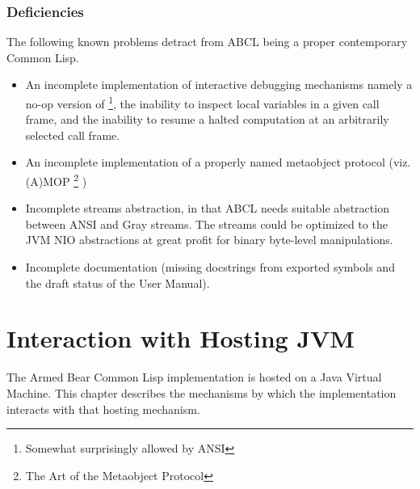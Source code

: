 \documentclass[10pt]{book}
\begin{document}
\subsection{Deficiencies}
The following known problems detract from \textsc{ABCL} being a proper
contemporary Common Lisp.
\begin{itemize}

  \item An incomplete implementation of interactive debugging
    mechanisms namely a no-op version of
     \footnote{Somewhat surprisingly allowed by
      \textsc{ANSI}}, the inability to inspect local variables in a
    given call frame, and the inability to resume a halted computation
    at an arbitrarily selected call frame.

  \item An incomplete implementation of a properly named metaobject
    protocol (viz. (A)MOP \footnote{The Art of the  Metaobject Protocol} )


  \item Incomplete streams abstraction, in that \textsc{ABCL} needs suitable
    abstraction between ANSI and Gray streams.  The streams could be
    optimized to the JVM NIO abstractions at great profit for binary
    byte-level manipulations.
    
  \item Incomplete documentation (missing docstrings from exported
    symbols and the draft status of the User Manual).

\end{itemize}

\chapter{Interaction with Hosting JVM}

%

The Armed Bear Common Lisp implementation is hosted on a Java Virtual
Machine.  This chapter describes the mechanisms by which the
implementation interacts with that hosting mechanism.
\end{document}
